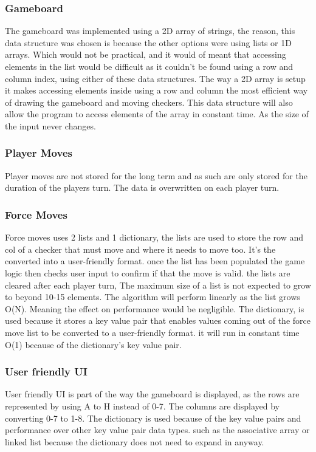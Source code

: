 \documentclass[10pt, a4paper]{article}
\begin{document}
	\subsubsection{Gameboard}
	The gameboard was implemented using a 2D array of strings, the reason, this data structure was chosen is because the other options were using lists or 1D arrays. Which would not be practical, and it would of meant that accessing elements in the list would be difficult as it couldn't be found using a row and column index, using either of these data structures. 
The way a 2D array is setup it makes accessing elements inside using a row and column the most efficient way of drawing the gameboard and moving checkers. This data structure will also allow the program to access elements of the array in constant time. As the size of the input never changes.\cite{Arrays}
	\subsubsection{Player Moves}
          Player moves are not stored for the long term and as such are only stored for the duration of the players turn. The data is overwritten on each player turn. 
	\subsubsection{Force Moves}
	Force moves uses 2 lists and 1 dictionary, the lists are used to store the row and col of a checker that must move and where it needs to move too. It's the converted into a user-friendly format. once the list has been populated the game logic then checks user input to confirm if that the move is valid. the lists are cleared after each player turn, The maximum size of a list is not expected to grow to beyond 10-15 elements. The algorithm will perform linearly as the list grows O(N).   Meaning the effect on performance would be negligible.\cite{Bell}
The dictionary, is used because it stores a key value pair that enables values coming out of the force move list to be converted to a user-friendly format. it will run in constant time O(1) because of the dictionary's key value pair.
	\subsubsection{User friendly UI}
	User friendly UI is part of the way the gameboard is displayed, as the rows are represented by using A to H instead of 0-7. The columns are displayed by converting 0-7 to 1-8. The dictionary is used because of the key value pairs and performance over other key value pair data types. such as the associative array or linked list because the dictionary does not need to expand in anyway.
\end{document}
